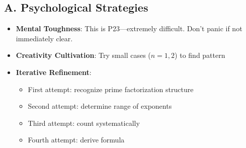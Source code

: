 \documentclass[12pt]{article}
\begin{document}
\begin{strategicbox}
\subsection*{A. Psychological Strategies}
\begin{itemize}[leftmargin=*]
    \item \textbf{Mental Toughness}: This is P23—extremely difficult. Don't panic if not immediately clear.
    \item \textbf{Creativity Cultivation}: Try small cases ($n = 1, 2$) to find pattern
    \item \textbf{Iterative Refinement}: 
    \begin{itemize}
        \item First attempt: recognize prime factorization structure
        \item Second attempt: determine range of exponents
        \item Third attempt: count systematically
        \item Fourth attempt: derive formula
    \end{itemize}
\end{itemize}


\end{strategicbox}
\end{document}
